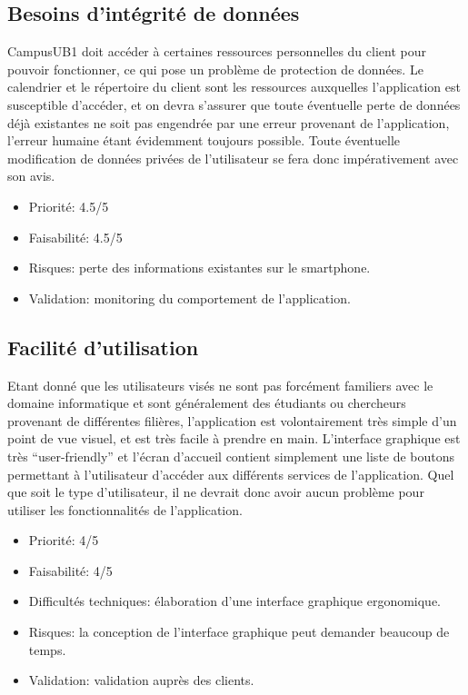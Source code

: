 \documentclass [pdftex,12pt] {report}
\begin{document}
\subsection{Besoins d'intégrité de données}
CampusUB1 doit accéder à certaines ressources personnelles du client pour pouvoir fonctionner, ce qui pose un problème de protection de données. Le calendrier et le répertoire du client sont les ressources auxquelles l'application est susceptible d'accéder, et on devra s'assurer que toute éventuelle perte de données déjà existantes ne soit pas engendrée par une erreur provenant de l'application, l'erreur humaine étant évidemment toujours possible. Toute éventuelle  modification de données privées de l'utilisateur se fera donc impérativement avec son avis. 

\begin{itemize}
\renewcommand{\labelitemi}{$\bullet$}
\item Priorité: 4.5/5
\item Faisabilité: 4.5/5
\item Risques: perte des informations existantes sur le smartphone.
\item Validation: monitoring du comportement de l'application.
\end{itemize} 

\subsection{Facilité d'utilisation}
Etant donné que les utilisateurs visés ne sont pas forcément familiers avec le domaine informatique et sont généralement des étudiants ou chercheurs provenant de différentes filières, l'application est volontairement très simple d'un point de vue visuel, et est très facile à prendre en main. L'interface graphique est très ``user-friendly'' et l'écran d'accueil contient simplement une liste de boutons permettant à l'utilisateur d'accéder aux différents services de l'application. Quel que soit le type d'utilisateur, il ne devrait donc avoir aucun problème pour utiliser les fonctionnalités de l'application.  

\begin{itemize}
\renewcommand{\labelitemi}{$\bullet$}
\item Priorité: 4/5
\item Faisabilité: 4/5
\item Difficultés techniques: élaboration d'une interface graphique ergonomique.
\item Risques: la conception de l'interface graphique peut demander beaucoup de temps.
\item Validation: validation auprès des clients.
\end{itemize} 
\end{document}
